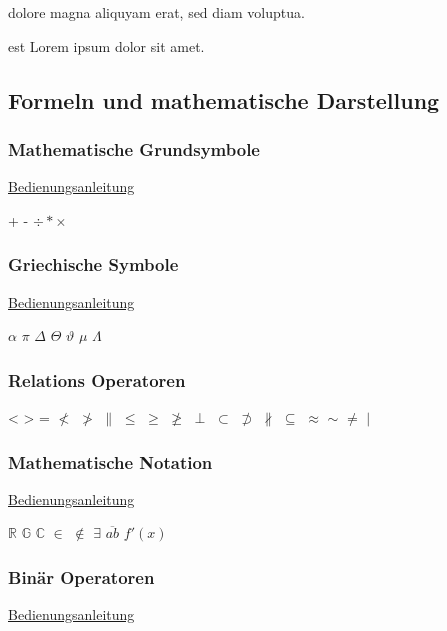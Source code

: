 \documentclass[a4paper, 11pt]{article}
\begin{document}
dolore magna aliquyam erat, sed diam voluptua.\footnotemark
{} 

est Lorem ipsum dolor sit amet.\footnotemark
{}

\subsection{Formeln und mathematische Darstellung}

\subsubsection{Mathematische Grundsymbole}

\href{https://oeis.org/wiki/List_of_LaTeX_mathematical_symbols}{Bedienungsanleitung}

+
-
$\div \ast \times$

\subsubsection{Griechische Symbole}

\href{https://oeis.org/wiki/List_of_LaTeX_mathematical_symbols}{Bedienungsanleitung}

$\alpha$
$\pi$
$\Delta$
$\Theta$
$\vartheta$
$\mu$
$\Lambda$

\subsubsection{Relations Operatoren}

< > =
$\nless$
$\ngtr$
$\parallel$
$\leq$
$\geq$
$\ngeqslant$
$\perp$
$\subset$
$\not\supset$
$\nparallel$
$\subseteq$
$\approx$
$\sim$
$\neq$
$\mid$

\subsubsection{Mathematische Notation}

\href{https://oeis.org/wiki/List_of_LaTeX_mathematical_symbols}{Bedienungsanleitung}

$\mathbb{R}$
$\mathbb{G}$
$\mathbb{C}$
$\in$
$\notin$
$\exists$
$\overline{ab}$
$f'(x)$

\subsubsection{Binär Operatoren}

\href{https://oeis.org/wiki/List_of_LaTeX_mathematical_symbols}{Bedienungsanleitung}
\end{document}
